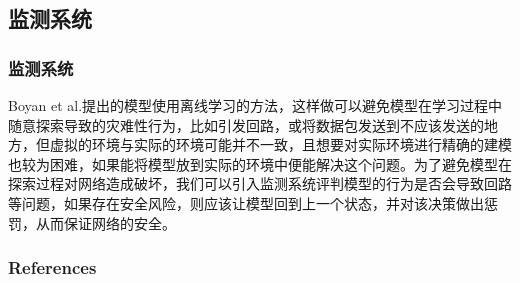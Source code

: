 \documentclass[hyperref={pdfpagelabels=false}]{beamer}
\begin{document}
\subsection{监测系统}
\begin{frame}
	\frametitle{监测系统}
	Boyan et al.\cite{boyan1994packet}提出的模型使用离线学习的方法，这样做可以避免模型在学习过程中随意探索导致的灾难性行为，比如引发回路，或将数据包发送到不应该发送的地方，但虚拟的环境与实际的环境可能并不一致，且想要对实际环境进行精确的建模也较为困难，如果能将模型放到实际的环境中便能解决这个问题。为了避免模型在探索过程对网络造成破坏，我们可以引入监测系统评判模型的行为是否会导致回路等问题，如果存在安全风险，则应该让模型回到上一个状态，并对该决策做出惩罚，从而保证网络的安全。
\end{frame}




\begin{frame}[allowframebreaks]
	\frametitle{References}
	
	
\end{frame}
\end{document}
